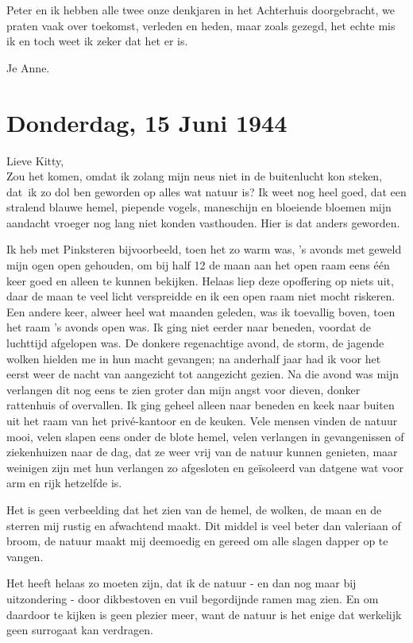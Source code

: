 \documentclass{book}
\begin{document}
Peter en ik hebben alle twee onze denkjaren in het Achterhuis doorgebracht, we
praten vaak over toekomst, verleden en heden, maar zoals gezegd, het echte mis
ik en toch weet ik zeker dat het er is.

Je Anne.

\section*{Donderdag, 15 Juni 1944}

Lieve Kitty,\\
Zou het komen, omdat ik zolang mijn neus niet in de buitenlucht
kon steken, dat~ik zo dol ben geworden op alles wat natuur is? Ik weet nog heel
goed, dat een stralend blauwe hemel, piepende vogels, maneschijn en bloeiende
bloemen mijn aandacht vroeger nog lang niet konden vasthouden. Hier is dat
anders geworden.

Ik heb met Pinksteren bijvoorbeeld, toen het zo warm was, 's avonds met geweld
mijn ogen open gehouden, om bij half 12 de maan aan het open raam eens één keer
goed en alleen te kunnen bekijken. Helaas liep deze opoffering op niets uit,
daar de maan te veel licht verspreidde en ik een open raam niet mocht riskeren.
Een andere keer, alweer heel wat maanden geleden, was ik toevallig boven, toen
het raam 's avonds open was. Ik ging niet eerder naar beneden, voordat de
luchttijd afgelopen was. De donkere regenachtige avond, de storm, de jagende
wolken hielden me in hun macht gevangen; na anderhalf jaar had ik voor het eerst
weer de nacht van aangezicht tot aangezicht gezien. Na die avond was mijn
verlangen dit nog eens te zien groter dan mijn angst voor dieven, donker
rattenhuis of overvallen. Ik ging geheel alleen naar beneden en keek naar buiten
uit het raam van het privé-kantoor en de keuken. Vele mensen vinden de natuur
mooi, velen slapen eens onder de blote hemel, velen verlangen in gevangenissen
of ziekenhuizen naar de dag, dat ze weer vrij van de natuur kunnen genieten,
maar weinigen zijn met hun verlangen zo afgesloten en geïsoleerd van datgene wat
voor arm en rijk hetzelfde is.

Het is geen verbeelding dat het zien van de hemel, de wolken, de maan en de
sterren mij rustig en afwachtend maakt. Dit middel is veel beter dan valeriaan
of broom, de natuur maakt mij deemoedig en gereed om alle slagen dapper op te
vangen.

Het heeft helaas zo moeten zijn, dat ik de natuur - en dan nog maar bij
uitzondering - door dikbestoven en vuil begordijnde ramen mag zien. En om
daardoor te kijken is geen plezier meer, want de natuur is het enige dat
werkelijk geen surrogaat kan verdragen.
\end{document}
